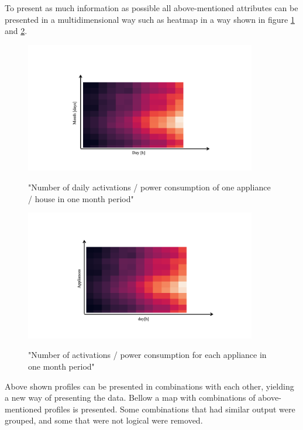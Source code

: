 To present as much information as possible all above-mentioned attributes 
can be presented in a multidimensional way such as heatmap in a way shown in figure \ref{fig:heatmap_2dtime} and \ref{fig:heatmap_all_appl}.

\begin{figure}[H]
	\centering
	\caption{"Number of daily activations / power consumption of one appliance / house in one month period"}
	\includegraphics[width=0.9\textwidth]{Figures/profile_sketches/Slide10.png}
	\label{fig:heatmap_2dtime}
\end{figure}
\begin{figure}[H]
	\centering
	\caption{"Number of activations / power consumption for each appliance in one month period"}
	\includegraphics[width=0.9\textwidth]{Figures/profile_sketches/Slide12.png}
	\label{fig:heatmap_all_appl}
\end{figure}

Above shown profiles can be presented in combinations with each other, yielding a new way of presenting the data.
Bellow a map with combinations of above-mentioned profiles is presented. Some combinations that had similar output were grouped,
and some that were not logical were removed. 

